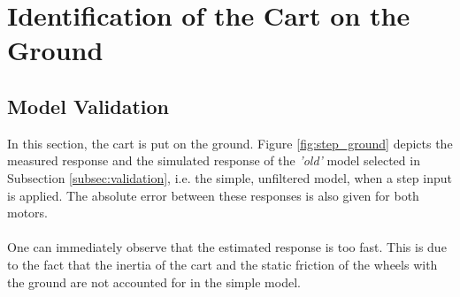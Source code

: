 \documentclass[a4paper,kul]{kulakarticle} %
\begin{document}

\section{Identification of the Cart on the Ground}

\subsection{Model Validation}



In this section, the cart is put on the ground. Figure \ref{fig:step_ground} depicts the measured response and the simulated response of the \textit{'old'} model selected in Subsection \ref{subsec:validation}, i.e. the simple, unfiltered model, when a step input is applied. The absolute error between these responses is also given for both motors.
\\\\
One can immediately observe that the estimated response is too fast. This is due to the fact that the inertia of the cart and the static friction of the wheels with the ground are not accounted for in the simple model. 
\end{document}
